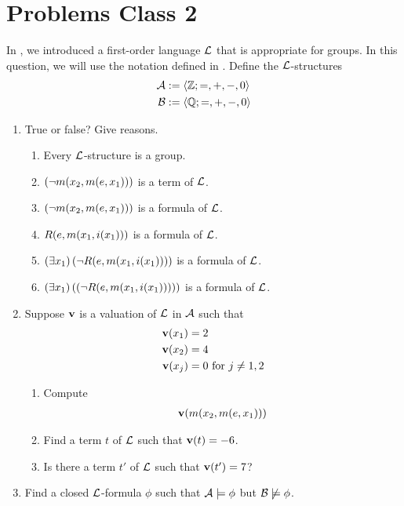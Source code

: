 \section*{Problems Class 2}
\setcounter{PC}{2}

\begin{boxproblem}
    In , we introduced a first-order language $\mathcal{L}$ that is appropriate for groups. In this question, we will use the notation defined in . Define the $\mathcal{L}$-structures
    \begin{align*}
        \mathcal{A} &:= \left\langle \mathbb{Z}; =, +, -, 0 \right\rangle \\
        \mathcal{B} &:= \left\langle \mathbb{Q}; =, +, -, 0 \right\rangle
    \end{align*}
    \begin{enumerate}[label = \normalfont \arabic*.]
        \item True or false? Give reasons.
        \begin{enumerate}[label = \normalfont (\alph*)]
            \item Every $\mathcal{L}$-structure is a group.
            \item $\left( \neg m\!\left( x_2, m\!\left( e, x_1 \right) \right) \right)$ is a term of $\mathcal{L}$.
            \item $\left( \neg m\!\left( x_2, m\!\left( e, x_1 \right) \right) \right)$ is a formula of $\mathcal{L}$.
            \item $R\!\left( e, m\!\left( x_1, i\!\left( x_1 \right) \right) \right)$ is a formula of $\mathcal{L}$.
            \item $\left( \exists x_1 \right)\left( \neg R\!\left( e, m\!\left( x_1, i\!\left( x_1 \right) \right) \right) \right)$ is a formula of $\mathcal{L}$.
            \item $\left( \exists x_1 \right)\left( \left( \neg R\!\left( e, m\!\left( x_1, i\!\left( x_1 \right) \right) \right) \right) \right)$ is a formula of $\mathcal{L}$.
        \end{enumerate}

        \item Suppose $\mathbf{v}$ is a valuation of $\mathcal{L}$ in $\mathcal{A}$ such that
        \begin{align*}
            \mathbf{v}\!\left( x_1 \right) &= 2 \\
            \mathbf{v}\!\left( x_2 \right) &= 4 \\
            \mathbf{v}\!\left( x_j \right) &= 0 \text{ for } j \neq 1, 2
        \end{align*}
        \begin{enumerate}
            \item Compute
            \begin{align*}
                \mathbf{v}\!\left( m\!\left( x_2, m\!\left( e, x_1 \right) \right) \right)
            \end{align*}
            \item Find a term $t$ of $\mathcal{L}$ such that $\mathbf{v}\!\left( t \right) = -6$.
            \item Is there a term $t'$ of $\mathcal{L}$ such that $\mathbf{v}\!\left( t' \right) = 7$?
        \end{enumerate}

        \item Find a closed $\mathcal{L}$-formula $\phi$ such that $\mathcal{A} \models \phi$ but $\mathcal{B} \not\models \phi$.
    \end{enumerate}
\end{boxproblem}
